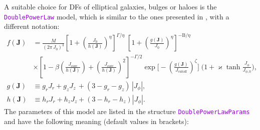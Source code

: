 \documentclass[12pt]{article}
\newcommand{\ttt}[1]{\textcolor{darkviolet}{\texttt{#1}}}
\newcommand{\bJ}{\boldsymbol{J}}
\newcommand{\Beta}{\mathrm B}
\begin{document}
A suitable choice for DFs of elliptical galaxies, bulges or haloes is the \ttt{DoublePowerLaw} model, which is similar to the ones presented in \cite{Binney2014, Posti2015}, with a different notation:
\begin{align*}
f(\bJ) &= \frac{M}{(2\pi\, J_0)^3}
\left[1 + \left(\frac{J_0}{h(\bJ)}\right)^\eta \right]^{\Gamma / \eta} \;
\left[1 + \left(\frac{g(\bJ)}{J_0}\right)^\eta \right]^{-\Beta / \eta} \\
&\times
\left[1 - \beta\left(\frac{J_\mathrm{core}}{h(\bJ)}\right) + 
\left(\frac{J_\mathrm{core}}{h(\bJ)}\right)^2 \right]^{-\Gamma/2}
\exp\bigg[-\left(\frac{g(\bJ)}{J_\mathrm{cutoff}}\right)^\zeta\bigg] \;
\bigg(1 + \varkappa\tanh \frac{J_\phi}{J_{\phi,0}} \bigg), \\
g(\bJ) &\equiv g_r J_r + g_z J_z\, + (3-g_r-g_z)\, |J_\phi|, \\
h(\bJ) &\equiv h_r J_r + h_z J_z   + (3-h_r-h_z)   |J_\phi|.
\end{align*}
The parameters of this model are listed in the structure \ttt{DoublePowerLawParams} and have the following meaning (default values in brackets):
\end{document}
